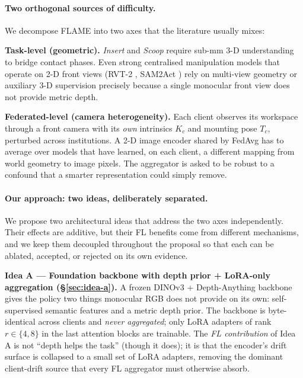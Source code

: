 \documentclass{article}
\begin{document}
\paragraph{Two orthogonal sources of difficulty.}
We decompose FLAME into two axes that the literature usually mixes:

\noindent\textbf{Task-level (geometric).} \emph{Insert} and
\emph{Scoop} require sub-mm 3-D understanding to bridge contact
phases. Even strong centralised manipulation models that operate on
2-D front views (RVT-2 \cite{rvt2}, SAM2Act \cite{sam2act}) rely on
multi-view geometry or auxiliary 3-D supervision precisely because a
single monocular front view does not provide metric depth.

\noindent\textbf{Federated-level (camera heterogeneity).}
Each client observes its workspace through a front camera with its
\emph{own} intrinsics $K_c$ and mounting pose $T_c$, perturbed
across institutions. A 2-D image encoder shared by FedAvg has to
average over models that have learned, on each client, a different
mapping from world geometry to image pixels. The aggregator is
asked to be robust to a confound that a smarter representation
could simply remove.

\paragraph{Our approach: two ideas, deliberately separated.}
We propose two architectural ideas that address the two axes
independently. Their effects are additive, but their FL benefits
come from different mechanisms, and we keep them decoupled
throughout the proposal so that each can be ablated, accepted, or
rejected on its own evidence.

\noindent\textbf{Idea A --- Foundation backbone with depth prior +
LoRA-only aggregation (\S\ref{sec:idea-a}).} A frozen DINOv3
\cite{dinov2} + Depth-Anything \cite{depthanything} backbone gives
the policy two things monocular RGB does not provide on its own:
self-supervised semantic features and a metric depth prior. The
backbone is byte-identical across clients and \emph{never
aggregated}; only LoRA \cite{lora} adapters of rank
$r\!\in\!\{4,8\}$ in the last attention blocks are trainable. The
\emph{FL contribution} of Idea A is not ``depth helps the task''
(though it does); it is that the encoder's drift surface is
collapsed to a small set of LoRA adapters, removing the dominant
client-drift source that every FL aggregator must otherwise absorb.
\end{document}

